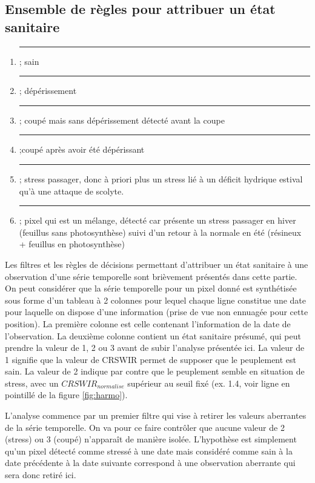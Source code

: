 \documentclass[a4paper, 12pt]{article} %
\newcommand\crule[3][black]{\textcolor{#1}{\rule{#2}{#3}}}
\begin{document}
\subsection{Ensemble de règles pour attribuer un état sanitaire}\label{subsec:ES}

\begin{enumerate}
	\item \crule[cl1]{1cm}{1cm} ; sain 
	\item \crule[cl2]{1cm}{1cm} ; dépérissement 
	\item \crule[cl3]{1cm}{1cm} ; coupé mais sans dépérissement détecté avant la coupe 
	\item  \crule[cl4]{1cm}{1cm} ;coupé après avoir été dépérissant
	\item \crule[cl5]{1cm}{1cm} ; stress passager, donc à priori plus un stress lié à un déficit hydrique estival qu'à une attaque de scolyte. 
	\item \crule[cl6]{1cm}{1cm} ; pixel qui est un mélange, détecté car présente un stress passager en hiver (feuillus sans photosynthèse) suivi d'un retour à la normale en été (résineux + feuillus en photosynthèse) 
\end{enumerate}

Les filtres et les règles de décisions permettant d'attribuer un état sanitaire à une observation d'une série temporelle sont brièvement présentés dans cette partie. On peut considérer que la série temporelle pour un pixel donné est synthétisée sous forme d'un tableau à 2 colonnes pour lequel chaque ligne constitue une date pour laquelle on dispose d'une information (prise de vue non ennuagée pour cette position). La première colonne est celle contenant l'information de la date de l'observation. La deuxième colonne contient un état sanitaire présumé, qui peut prendre la valeur de 1, 2 ou 3 avant de subir l'analyse présentée ici. La valeur de 1 signifie que la valeur de CRSWIR permet de supposer que le peuplement est sain. La valeur de 2 indique par contre que le peuplement semble en situation de stress, avec un $CRSWIR_{normalise}$ supérieur au seuil fixé (ex. 1.4, voir ligne en pointillé de la figure \ref{fig:harmo}).

L'analyse commence par un premier filtre qui vise à retirer les valeurs aberrantes de la série temporelle. On va pour ce faire contrôler que aucune valeur de 2 (stress) ou 3 (coupé) n'apparaît de manière isolée. L'hypothèse est simplement qu'un pixel détecté comme stressé à une date mais considéré comme sain à la date précédente à la date suivante correspond à une observation aberrante qui sera donc retiré ici.
\end{document}
